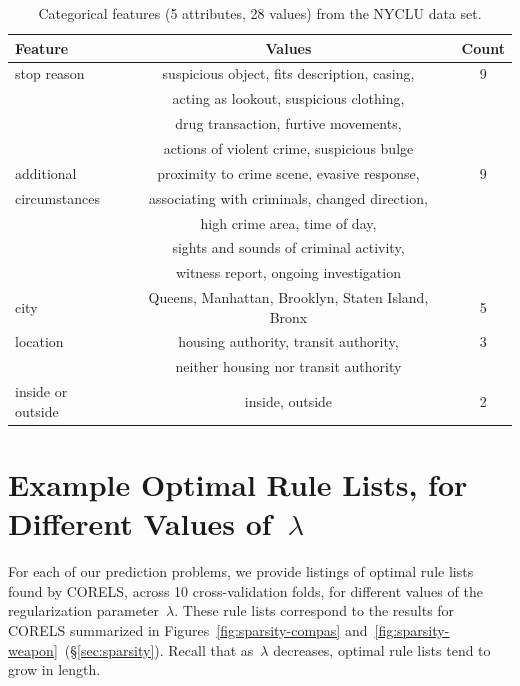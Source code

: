\documentclass[twoside,11pt]{article}
\def\Reg{{\lambda}}
\begin{document}
\begin{table}[h!]
\centering
\begin{tabular}{l | c  c}
Feature & Values & Count \\
\hline
stop reason & suspicious object, fits description, casing, & 9 \\
& acting as lookout, suspicious clothing, & \\
& drug transaction, furtive movements, & \\
& actions of violent crime, suspicious bulge \\
\hline
additional & proximity to crime scene, evasive response,  & 9 \\
circumstances & associating with criminals, changed direction, & \\
& high crime area, time of day,  & \\
& sights and sounds of criminal activity, & \\
& witness report, ongoing investigation & \\
\hline
city & Queens,  Manhattan, Brooklyn, Staten Island, Bronx & 5 \\
\hline
location & housing authority, transit authority, & 3 \\
& neither housing nor transit authority & \\
\hline
inside or outside & inside, outside & 2 \\
\end{tabular}
\caption{Categorical features (5 attributes, 28 values) from the NYCLU data set.}
\vspace{4mm}
\label{tab:frisk-data}
\end{table}

\section{Example Optimal Rule Lists, for Different Values of~$\Reg$}
\label{appendix:examples}

For each of our prediction problems, we provide listings of
optimal rule lists found by CORELS, across 10 cross-validation folds,
for different values of the regularization parameter~$\Reg$.
%
These rule lists correspond to the results for CORELS summarized
in Figures~\ref{fig:sparsity-compas} and~\ref{fig:sparsity-weapon}~(\S\ref{sec:sparsity}).
%
Recall that as~$\Reg$ decreases, optimal rule lists tend to grow in length. \\
\end{document}
